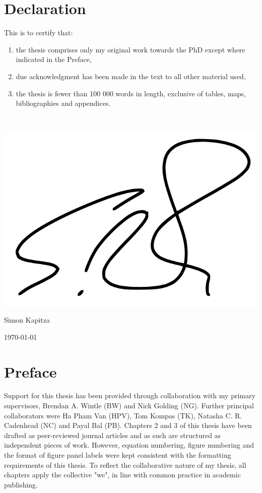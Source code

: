 \documentclass[titlesmallcaps,copyrightpage]{uomthesis}\usepackage[]{graphicx}\usepackage[]{color}
\begin{document}
\clearpage{\pagestyle{empty}\cleardoublepage}

\chapter{Declaration}
This is to certify that:
{\renewcommand{\theenumi}{\roman{enumi}}%
\begin{enumerate}
 \item the thesis comprises only my original work towards the PhD except where indicated in the Preface,
 \item due acknowledgment has been made in the text to all other material used,
 \item the thesis is fewer than 100 000 words in length, exclusive of tables, maps, bibliographies and appendices.
\end{enumerate}
}
\hrulefill \\

\begin{flushright} 
\includegraphics[scale=0.2,trim={0 0 0 0},clip]{signature.jpg}

Simon Kapitza

\today
\end{flushright}
\clearpage{\pagestyle{empty}\cleardoublepage}

\chapter{Preface}
Support for this thesis has been provided through collaboration with my primary supervisors, Brendan A. Wintle (BW) and Nick Golding (NG). Further principal collaborators were Ha Pham Van (HPV), Tom Kompas (TK), Natasha C. R. Cadenhead (NC) and Payal Bal (PB). Chapters 2 and 3 of this thesis have been drafted as peer-reviewed journal articles and as such are structured as independent pieces of work. However, equation numbering, figure numbering and the format of figure panel labels were kept consistent with the formatting requirements of this thesis. To reflect the collaborative nature of my thesis, all chapters apply the collective "we", in line with common practice in academic publishing.
\end{document}
